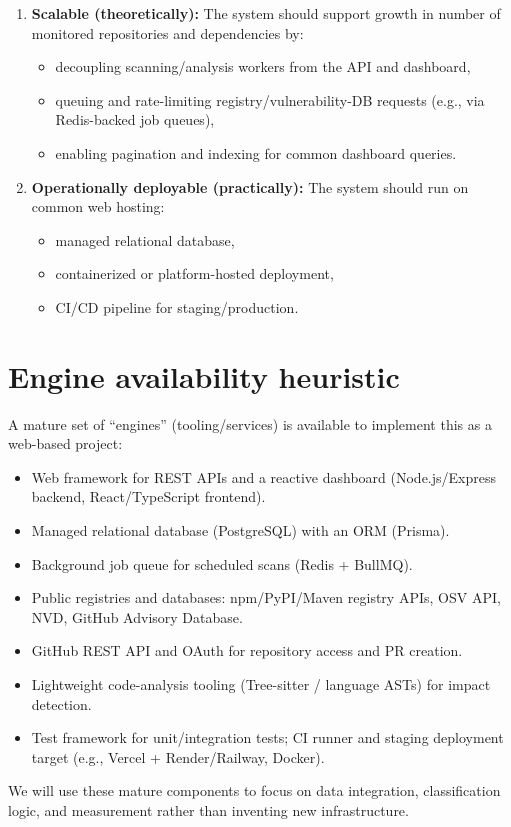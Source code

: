 \documentclass[11pt,a4paper]{article}
\begin{document}
\begin{enumerate}[leftmargin=0.7cm]
    \item \textbf{Scalable (theoretically):} The system should support growth in number of monitored repositories and dependencies by:
    \begin{itemize}[leftmargin=0.7cm]
        \item decoupling scanning/analysis workers from the API and dashboard,
        \item queuing and rate-limiting registry/vulnerability-DB requests (e.g., via Redis-backed job queues),
        \item enabling pagination and indexing for common dashboard queries.
    \end{itemize}
    
    \item \textbf{Operationally deployable (practically):} The system should run on common web hosting:
    \begin{itemize}[leftmargin=0.7cm]
        \item managed relational database,
        \item containerized or platform-hosted deployment,
        \item CI/CD pipeline for staging/production.
    \end{itemize}
\end{enumerate}

\section{Engine availability heuristic}
A mature set of ``engines'' (tooling/services) is available to implement this as a web-based project:
\begin{itemize}[leftmargin=0.7cm]
    \item Web framework for REST APIs and a reactive dashboard (Node.js/Express backend, React/TypeScript frontend).
    \item Managed relational database (PostgreSQL) with an ORM (Prisma).
    \item Background job queue for scheduled scans (Redis + BullMQ).
    \item Public registries and databases: npm/PyPI/Maven registry APIs, OSV API, NVD, GitHub Advisory Database.
    \item GitHub REST API and OAuth for repository access and PR creation.
    \item Lightweight code-analysis tooling (Tree-sitter / language ASTs) for impact detection.
    \item Test framework for unit/integration tests; CI runner and staging deployment target (e.g., Vercel + Render/Railway, Docker).
\end{itemize}
We will use these mature components to focus on data integration, classification logic, and measurement rather than inventing new infrastructure.
\end{document}
